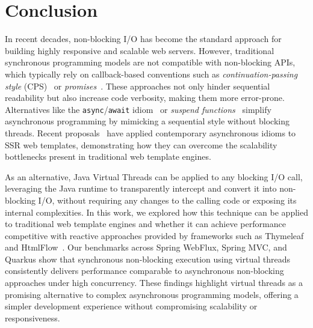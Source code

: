 \section{Conclusion}

In recent decades, non-blocking I/O has become the standard approach for building
highly responsive and scalable web servers. However, traditional synchronous
programming models are not compatible with non-blocking APIs, which typically
rely on callback-based conventions such as
\textit{continuation-passing style} (CPS)~\cite{scheme} or
\textit{promises}~\cite{promise}. These approaches not only hinder
sequential readability but also increase code verbosity, making them more
error-prone.
Alternatives like the \texttt{async}/\texttt{await} idiom~\cite{async_await}
or \textit{suspend functions}~\cite{elizarov2021coroutines} simplify
asynchronous programming by mimicking a sequential style without blocking
threads.
Recent proposals~\cite{carvalho2023async,wise2024pssr} have applied contemporary
asynchronous idioms to SSR web templates, demonstrating how they can overcome
the scalability bottlenecks present in traditional web template engines.

As an alternative, Java Virtual Threads can be applied to any blocking I/O call,
leveraging the Java runtime to transparently intercept and convert it into non-blocking I/O,
without requiring any changes to the calling code or exposing its internal complexities.
In this work, we explored how this technique can be applied to traditional
web template engines and whether it can achieve performance competitive with
reactive approaches provided by frameworks such as Thymeleaf~\cite{webflux} and HtmlFlow~\cite{htmlflow}.
Our benchmarks across Spring WebFlux, Spring MVC, and Quarkus show that synchronous
non-blocking execution using virtual threads consistently delivers performance
comparable to asynchronous non-blocking approaches under high concurrency.
These findings highlight virtual threads as a promising alternative to complex
asynchronous programming models, offering a simpler development experience
without compromising scalability or responsiveness.